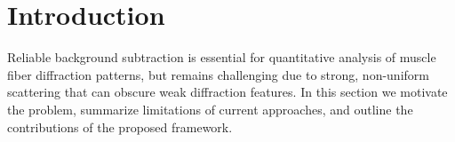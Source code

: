 \documentclass[iucr]{iucrjournals}
\begin{document}




\section{Introduction}

Reliable background subtraction is essential for quantitative analysis of muscle fiber diffraction patterns, but remains challenging due to strong, non-uniform scattering that can obscure weak diffraction features. In this section we motivate the problem, summarize limitations of current approaches, and outline the contributions of the proposed framework.

\end{document}
